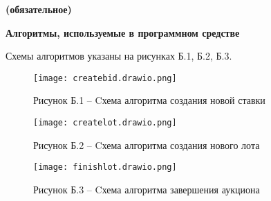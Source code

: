 \normalfont
\vspace{-\baselineskip} %
\begin{center}
\textbf{(обязательное)}

\textbf{Алгоритмы, используемые в программном средстве}
\end{center}

Схемы алгоритмов указаны на рисунках Б.1, Б.2, Б.3.
\begin{figure}[h]
    \centering
    \texttt{[image: createbid.drawio.png]}
    \caption*{Рисунок Б.1 – Cхема алгоритма создания новой ставки}
\end{figure}

\newpage
\begin{figure}[h]
    \centering
    \texttt{[image: createlot.drawio.png]}
    \caption*{Рисунок Б.2 – Cхема алгоритма создания нового лота}
\end{figure}

\newpage
\begin{figure}[h]
    \centering
    \texttt{[image: finishlot.drawio.png]}
    \caption*{Рисунок Б.3 – Cхема алгоритма завершения аукциона}
\end{figure}
